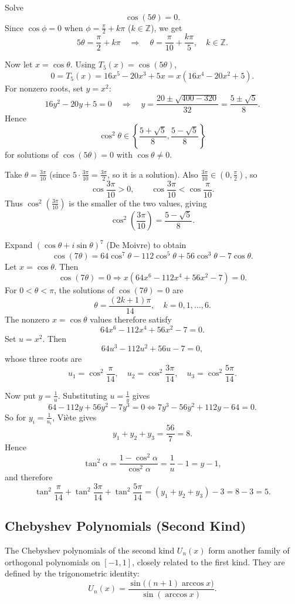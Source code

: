 \documentclass[12pt]{article}
\begin{document}
\begin{example}[Solve $\cos(5\theta)=0$ and deduce an exact value]
Solve
\[
  \cos(5\theta)=0.
\]
Since $\cos\phi=0$ when $\phi=\frac{\pi}{2}+k\pi$ ($k\in\mathbb Z$), we get
\[
  5\theta=\frac{\pi}{2}+k\pi
  \quad\Longrightarrow\quad
  \theta=\frac{\pi}{10}+\frac{k\pi}{5},\quad k\in\mathbb Z.
\]

Now let $x=\cos\theta$. Using $T_5(x)=\cos(5\theta)$,
\[
  0=T_5(x)=16x^5-20x^3+5x
  =x(16x^4-20x^2+5).
\]
For nonzero roots, set $y=x^2$:
\[
  16y^2-20y+5=0
  \quad\Longrightarrow\quad
  y=\frac{20\pm\sqrt{400-320}}{32}
  =\frac{5\pm\sqrt5}{8}.
\]
Hence
\[
  \cos^2\theta\in\left\{\frac{5+\sqrt5}{8},\frac{5-\sqrt5}{8}\right\}
\]
for solutions of $\cos(5\theta)=0$ with $\cos\theta\ne0$.

Take $\theta=\frac{3\pi}{10}$ (since $5\cdot\frac{3\pi}{10}=\frac{3\pi}{2}$, so it is a solution). Also $\frac{3\pi}{10}\in\left(0,\frac{\pi}{2}\right)$, so
\[
  \cos\frac{3\pi}{10}>0,\qquad
  \cos\frac{3\pi}{10}<\cos\frac{\pi}{10}.
\]
Thus $\cos^2\!\left(\frac{3\pi}{10}\right)$ is the smaller of the two values, giving
\[
  \cos^2\!\left(\frac{3\pi}{10}\right)=\frac{5-\sqrt5}{8}.
\]
\end{example}

\begin{example}
Expand $(\cos\theta+i\sin\theta)^7$ (De Moivre) to obtain
\[
  \cos(7\theta)=64\cos^7\theta-112\cos^5\theta+56\cos^3\theta-7\cos\theta.
\]
Let $x=\cos\theta$. Then
\[
  \cos(7\theta)=0
  \Longrightarrow
  x\left(64x^6-112x^4+56x^2-7\right)=0.
\]
For $0<\theta<\pi$, the solutions of $\cos(7\theta)=0$ are
\[
  \theta=\frac{(2k+1)\pi}{14},\quad k=0,1,\dots,6.
\]
The nonzero $x=\cos\theta$ values therefore satisfy
\[
  64x^6-112x^4+56x^2-7=0.
\]
Set $u=x^2$. Then
\[
  64u^3-112u^2+56u-7=0,
\]
whose three roots are
\[
  u_1=\cos^2\frac{\pi}{14},\quad
  u_2=\cos^2\frac{3\pi}{14},\quad
  u_3=\cos^2\frac{5\pi}{14}.
\]

Now put $y=\frac1u$. Substituting $u=\frac1y$ gives
\[
  64-112y+56y^2-7y^3=0
  \Longleftrightarrow
  7y^3-56y^2+112y-64=0.
\]
So for $y_i=\frac1{u_i}$, Vi\`ete gives
\[
  y_1+y_2+y_3=\frac{56}{7}=8.
\]
Hence
\[
  \tan^2\alpha=\frac{1-\cos^2\alpha}{\cos^2\alpha}=\frac1u-1=y-1,
\]
and therefore
\[
  \tan^2\frac{\pi}{14}+\tan^2\frac{3\pi}{14}+\tan^2\frac{5\pi}{14}
  =(y_1+y_2+y_3)-3
  =8-3=5.
\]
\end{example}

\subsection{Chebyshev Polynomials (Second Kind)}
The Chebyshev polynomials of the second kind $U_n(x)$ form another family of orthogonal polynomials on $[-1,1]$, closely related to the first kind. They are defined by the trigonometric identity:
\[ U_n(x) = \frac{\sin\big((n+1)\arccos x\big)}{\sin(\arccos x)}. \]
\end{document}
